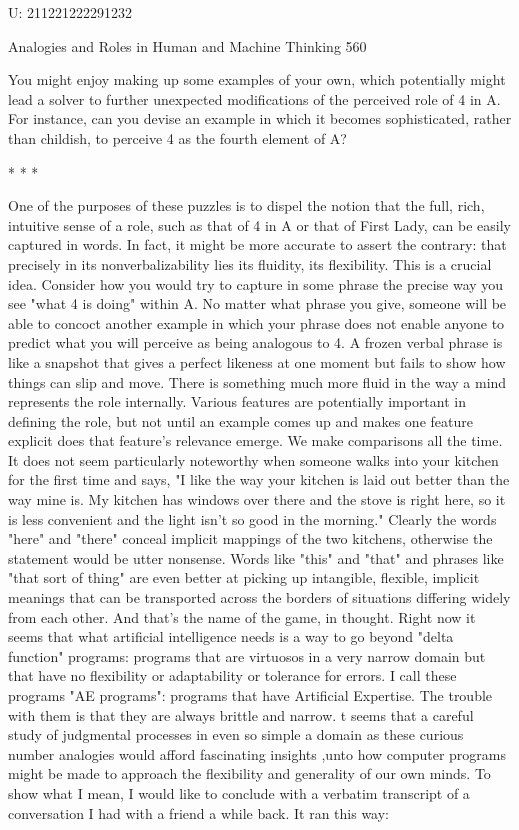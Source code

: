        U:   211221222291232




Analogies and Roles in Human and Machine Thinking                                  560

You might enjoy making up some examples of your own, which potentially might
lead a solver to further unexpected modifications of the perceived role of 4 in A. For
instance, can you devise an example in which it becomes sophisticated, rather than
childish, to perceive 4 as the fourth element of A?

                                          *   *   *

        One of the purposes of these puzzles is to dispel the notion that the full, rich,
intuitive sense of a role, such as that of 4 in A or that of First Lady, can be easily
captured in words. In fact, it might be more accurate to assert the contrary: that
precisely in its nonverbalizability lies its fluidity, its flexibility. This is a crucial idea.
Consider how you would try to capture in some phrase the precise way you see "what
4 is doing" within A. No matter what phrase you give, someone will be able to
concoct another example in which your phrase does not enable anyone to predict what
you will perceive as being analogous to 4. A frozen verbal phrase is like a snapshot
that gives a perfect likeness at one moment but fails to show how things can slip and
move. There is something much more fluid in the way a mind represents the role
internally. Various features are potentially important in defining the role, but not until
an example comes up and makes one feature explicit does that feature's relevance
emerge.
        We make comparisons all the time. It does not seem particularly noteworthy
when someone walks into your kitchen for the first time and says, "I like the way your
kitchen is laid out better than the way mine is. My kitchen has windows over there
and the stove is right here, so it is less convenient and the light isn't so good in the
morning." Clearly the words "here" and "there" conceal implicit mappings of the two
kitchens, otherwise the statement would be utter nonsense. Words like "this" and
"that" and phrases like "that sort of thing" are even better at picking up intangible,
flexible, implicit meanings that can be transported across the borders of situations
differing widely from each other. And that's the name of the game, in thought.
        Right now it seems that what artificial intelligence needs is a way to go
beyond "delta function" programs: programs that are virtuosos in a very narrow
domain but that have no flexibility or adaptability or tolerance for errors. I call these
programs "AE programs": programs that have Artificial Expertise. The trouble with
them is that they are always brittle and narrow. t seems that a careful study of
judgmental processes in even so simple a domain as these curious number analogies
would afford fascinating insights ,unto how computer programs might be made to
approach the flexibility and generality of our own minds.
        To show what I mean, I would like to conclude with a verbatim transcript of a
conversation I had with a friend a while back. It ran this way:





